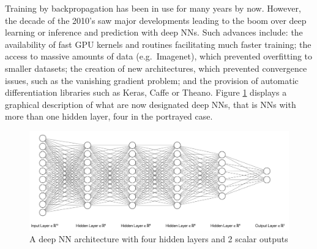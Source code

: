 Training by backpropagation has been in use 
for many years by now.
However,
the decade of the 2010's saw major developments
leading to 
the boom over deep learning \citep{deeplearningbook}
or inference and prediction with deep NNs. 
Such advances include:
the availability of fast GPU kernels and routines
facilitating much faster training;
the access to massive amounts of data (e.g.\ Imagenet), which prevented overfitting to smaller datasets; 
the creation of new architectures, which prevented  convergence issues, such as the vanishing gradient problem; 
and the provision of automatic differentiation libraries such as Keras, Caffe or Theano.
Figure \ref{figuradkk} displays a graphical description
of what are now designated 
deep NNs, that is NNs with more than one hidden
layer, four in the portrayed case.
\begin{figure}
    \centering
    \includegraphics[scale=0.35]{figures/net2.png}
    \caption{A deep NN architecture with four hidden layers and 2 scalar outputs}
    \label{figuradkk}
\end{figure}


